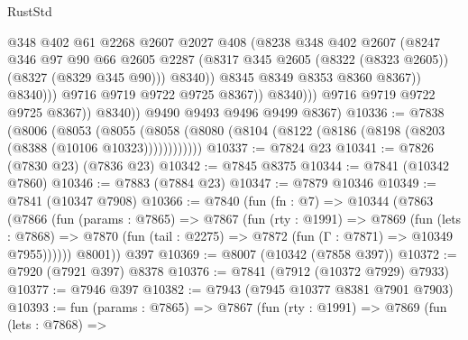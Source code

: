 \begin{lexlean}{RustStd}
\begin{coremodule}
{\begin{coremodule}
{{{{{{{{{{{{{{{{{{{{{{{{{{{{{{{{{{{{{{{{{{{{{{{{{{{{{{                                  @348
                                  @402
                                  @61
                                  @2268
                                  @2607
                                  @2027
                                  @408
                                  (@8238
                                    @348
                                    @402
                                    @2607
                                    (@8247
                                      @346
                                      @97
                                      @90
                                      @66
                                      @2605
                                      @2287
                                      (@8317
                                        @345
                                        @2605
                                        (@8322 (@8323 @2605))
                                        (@8327 (@8329 @345 @90)))
                                      @8340))
                                  @8345
                                  @8349
                                  @8353
                                  @8360
                                  @8367))
                              @8340)))
                        @9716
                        @9719
                        @9722
                        @9725
                        @8367))
                    @8340)))
              @9716
              @9719
              @9722
              @9725
              @8367))
          @8340))
      @9490
      @9493
      @9496
      @9499
      @8367)
@10336 := @7838
    (@8006
      (@8053
        (@8055 (@8058 (@8080 (@8104 (@8122 (@8186 (@8198 (@8203 (@8388 (@10106 @10323))))))))))))
@10337 := @7824 @23
@10341 := @7826 (@7830 @23) (@7836 @23)
@10342 := @7845 @8375
@10344 := @7841 (@10342 @7860)
@10346 := @7883 (@7884 @23)
@10347 := @7879 @10346
@10349 := @7841 (@10347 @7908)
@10366 := @7840
    (fun (fn : @7) =>
    @10344
      (@7863
        (@7866
          (fun (params : @7865) =>
          @7867
            (fun (rty : @1991) =>
            @7869
              (fun (lets : @7868) =>
              @7870 (fun (tail : @2275) => @7872 (fun (Γ : @7871) => @10349 @7955))))))
        @8001))
    @397
@10369 := @8007 (@10342 (@7858 @397))
@10372 := @7920 (@7921 @397) @8378
@10376 := @7841 (@7912 (@10372 @7929) @7933)
@10377 := @7946 @397
@10382 := @7943 (@7945 @10377 @8381 @7901 @7903)
@10393 := fun (params : @7865) =>
  @7867
    (fun (rty : @1991) =>
    @7869
      (fun (lets : @7868) =>
}}}}}}}}}}}}}}}}}}}}}}}}}}}}}}}}}}}}}}}}}}}}}}}}}}}}}}
\end{coremodule}}
\end{coremodule}
\end{lexlean}
